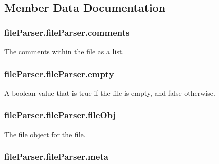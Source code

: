 \subsection{Member Data Documentation}
\hypertarget{classfile_parser_1_1file_parser_a9531ba3360a53c234d49f24cc3c0d5cd}{
\subsubsection[{comments}]{\setlength{\rightskip}{0pt plus 5cm}file\-Parser.\-file\-Parser.\-comments}}\label{classfile_parser_1_1file_parser_a9531ba3360a53c234d49f24cc3c0d5cd}


The comments within the file as a list. 

\hypertarget{classfile_parser_1_1file_parser_a8a31b5717e4f21af3f8b5f8d2f590310}{
\subsubsection[{empty}]{\setlength{\rightskip}{0pt plus 5cm}file\-Parser.\-file\-Parser.\-empty}}\label{classfile_parser_1_1file_parser_a8a31b5717e4f21af3f8b5f8d2f590310}


A boolean value that is true if the file is empty, and false otherwise. 

\hypertarget{classfile_parser_1_1file_parser_a7de27c6e6e7bc515c7909be87ea82dca}{
\subsubsection[{file\-Obj}]{\setlength{\rightskip}{0pt plus 5cm}file\-Parser.\-file\-Parser.\-file\-Obj}}\label{classfile_parser_1_1file_parser_a7de27c6e6e7bc515c7909be87ea82dca}


The file object for the file. 

\hypertarget{classfile_parser_1_1file_parser_aa84b3558bdd36dbba71265753c4fb04f}{
\subsubsection[{meta}]{\setlength{\rightskip}{0pt plus 5cm}file\-Parser.\-file\-Parser.\-meta}}\label{classfile_parser_1_1file_parser_aa84b3558bdd36dbba71265753c4fb04f}


